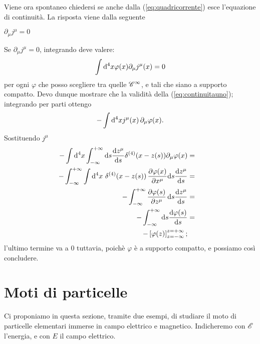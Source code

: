 Viene ora spontaneo chiedersi se anche dalla (\ref{eq:quadricorrente})
esce l'equazione di continuit\`a. La risposta viene dalla seguente
\begin{proposizione}
  $\partial_{\mu}j^{\mu} = 0$
\end{proposizione}
\begin{dimostrazione}
  Se $\partial_{\mu}j^{\mu} = 0$, integrando deve valere:
  \begin{equation}
    \int \mathrm{d}^4 x \varphi(x) \partial_{\mu}j^{\mu}(x) = 0
    \label{eq:continuitauno}
  \end{equation}
  per ogni $\varphi$ che posso scegliere tra quelle $\mathscr{C}^{\infty}$,
  e tali che siano a supporto compatto. Devo dunque mostrare che la
  validit\`a della (\ref{eq:continuitauno}); integrando per parti
  ottengo
$$
-\int \mathrm{d}^4 x j^{\mu}(x) \, \partial_{\mu}\varphi(x).
$$
Sostituendo $j^{\mu}$
\begin{eqnarray*}
  -\int \mathrm{d}^4 x  \int_{-\infty}^{+\infty} \mathrm{d} s \frac{\mathrm{d}
    z^{\mu}}{\mathrm{d} s} \delta^{(4)}(x-z(s))
  \partial_{\mu}\varphi(x)
  & = & \\
  -\int_{-\infty}^{+\infty} \int \mathrm{d}^4 x\, \,\delta^{(4)}(x-z(s))\,
  \frac{\partial \varphi(x)}{\partial x^{\mu}} \mathrm{d} s \frac{\mathrm{d}
    z^{\mu}}{\mathrm{d} s} & = & \\
  -\int_{-\infty}^{+\infty} \frac{\partial\varphi(s)}{\partial
    z^{\mu}}\, \mathrm{d} s \frac{\mathrm{d} z^{\mu}}{\mathrm{d} s} & = & \\
  -\int_{-\infty}^{+\infty} \mathrm{d} s \frac{\mathrm{d} \varphi(s)}{\mathrm{d} s}
  & = & \\
  -\left[ \varphi(z)\right]_{z=-\infty}^{z=+\infty};
\end{eqnarray*}
l'ultimo termine va a 0 tuttavia, poich\`e $\varphi$ \`e a supporto
compatto, e possiamo cos\`i concludere.
\end{dimostrazione}


\section{ Moti di particelle}
Ci proponiamo in questa sezione, tramite due esempi, di studiare il
moto di particelle elementari immerse in campo elettrico e
magnetico. Indicheremo con $\mathscr{E}$ l'energia, e con $E$ il campo
elettrico.

